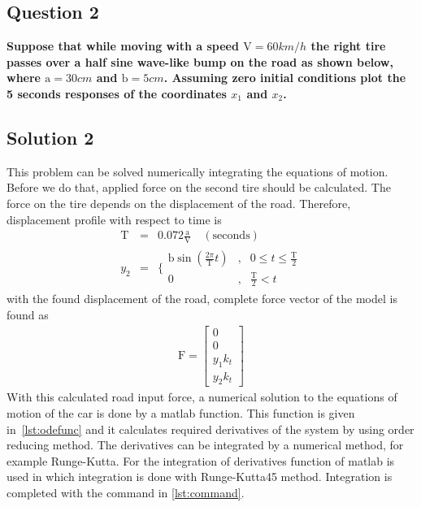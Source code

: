 \documentclass[]{report}
\begin{document}
\subsection*{Question 2}
\textbf{Suppose that while moving with a speed $\mathrm{V} = 60 km/h$ the right tire passes over a half sine wave-like bump on the road as shown below, where $\mathrm{a} = 30cm$ and $\mathrm{b} = 5cm$. Assuming zero initial conditions plot the 5 seconds responses of the coordinates $x_1$ and $x_2$.}
\begin{center}
\subsection*{Solution 2}
\end{center}
This problem can be solved numerically integrating the equations of motion. Before we do that, applied force on the second tire should be calculated. The force on the tire depends on the displacement of the road. Therefore, displacement profile with respect to time is
\begin{eqnarray*}
\mathrm{T}&= &0.072\frac{\mathrm{a}}{\mathrm{V}}\quad \mathrm{(seconds)}
\\
y_2&=&\{\begin{array}{clc}
\mathrm{b}\sin\left(\frac{2\pi}{\mathrm{T}}t\right) &,& 0\leq t \leq \frac{\mathrm{T}}{2} \\ 
0 &,& \frac{\mathrm{T}}{2}<t
\end{array}
\end{eqnarray*}
with the found displacement of the road, complete force vector of the model is found as
\begin{eqnarray*}
\mathrm{F}=\left[\begin{array}{ccc}
0\\
0\\
y_1 k_t\\
y_2 k_t
\end{array}\right]
\end{eqnarray*}
With this calculated road input force, a numerical solution to the equations of motion of the car is done by a matlab function. This function is given in~\cref{lst:odefunc} and it calculates required derivatives of the system by using order reducing method. The derivatives can be integrated by a numerical method, for example Runge-Kutta. For the integration of derivatives  function of matlab is used in which integration is done with Runge-Kutta45 method. Integration is completed with the command in \cref{lst:command}.
\lstset{frame=single,numbers=left}
\end{document}

